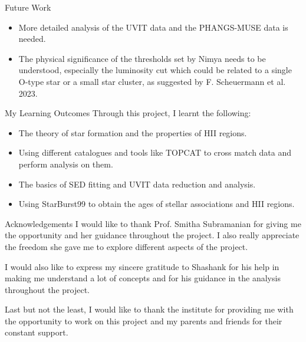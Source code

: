 \documentclass{beamer}
\begin{document}
\begin{frame}{Future Work}
    \begin{itemize}
        \item More detailed analysis of the UVIT data and the PHANGS-MUSE data is needed. 
        \item The physical significance of the thresholds set by Nimya needs to be understood, especially the luminosity cut which could be related to a single O-type star or a small star cluster, as suggested by F. Scheuermann et al. 2023.
    
    \end{itemize}
\end{frame}

\begin{frame}{My Learning Outcomes}
    Through this project, I learnt the following:
    \begin{itemize}
        \item The theory of star formation and the properties of HII regions.
        \item Using different catalogues and tools like TOPCAT to cross match data and perform analysis on them. 
        \item The basics of SED fitting and UVIT data reduction and analysis. 
        \item Using StarBurst99 to obtain the ages of stellar associations and HII regions.
    \end{itemize}
\end{frame}

\begin{frame}{Acknowledgements}
    I would like to thank Prof. Smitha Subramanian for giving me the opportunity and her guidance throughout the project. I also really appreciate the freedom she gave me to explore different aspects of the project. 

    I would also like to express my sincere gratitude to Shashank for his help in making me understand a lot of concepts and for his guidance in the analysis throughout the project.

    Last but not the least, I would like to thank the institute for providing me with the opportunity to work on this project and my parents and friends for their constant support.
\end{frame}
\end{document}
